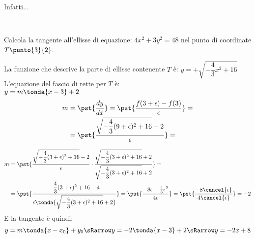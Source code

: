 Infatti...


\newpage %



\begin{esempio}
{~}

\begin{minipage}{.44\textwidth}
Calcola la tangente all'ellisse di equazione:
\(4x^2+3y^2=48\)
nel punto di coordinate \(T\punto{3}{2}\).

La funzione che descrive la parte di ellisse 
contenente \(T\) è:
\(y=+\sqrt{-\dfrac{4}{3}x^2+16}\)\\
L'equazione del fascio di rette per \(T\) è:\\
\(y=m\tonda{x-3}+2\)
\begin{align*}
m&=\pst{\dfrac{d y}{d x}}=
   \pst{\dfrac{f(3+\epsilon)-f(3)}{\epsilon}}=\\
 &=\pst{\dfrac{\sqrt{-\dfrac{4}{3}(9+\epsilon)^2+16}-2}{\epsilon}}=
\end{align*}
\end{minipage}
\hfill
\begin{minipage}{.54\textwidth}
\begin{center}\iperellisse\end{center}
\end{minipage}
\begin{align*}
m&=\pst{\dfrac{\sqrt{-\dfrac{4}{3}(3+\epsilon)^2+16}-2}{\epsilon} \cdot
        \dfrac{\sqrt{-\dfrac{4}{3}(3+\epsilon)^2+16}+2}
              {\sqrt{-\dfrac{4}{3}(3+\epsilon)^2+16}+2}}=\\
 &=\pst{\dfrac{-\dfrac{4}{3}(3+\epsilon)^2+16-4}
              { \epsilon\tonda{\sqrt{-\dfrac{4}{3}(3+\epsilon)^2+16}+2}}}=
   \pst{\dfrac{-8\epsilon-\frac{4}{3}\epsilon^2}{4 \epsilon}}=
   \pst{\dfrac{-8 \cancel{\epsilon}}{4 \cancel{\epsilon}}}=-2
\end{align*}
E la tangente è quindi:
\[y=m \tonda{x-x_0}+y_0 \sRarrow y=-2 \tonda{x-3}+2 \sRarrow y=-2x+8\]

\end{esempio}

